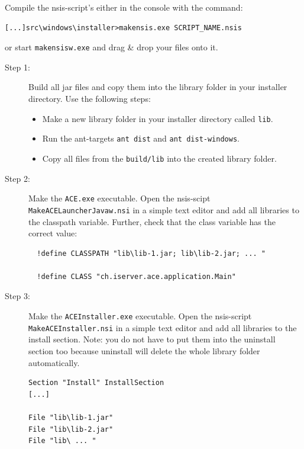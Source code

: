 \documentclass[11pt,a4paper]{article}
\begin{document}
Compile the nsis-script's either in the console with the command:
\begin{verbatim}
[...]src\windows\installer>makensis.exe SCRIPT_NAME.nsis
\end{verbatim}
or start \texttt{makensisw.exe} and drag \& drop your files onto it.

\begin{description}
\item[Step 1:] Build all jar files and copy them into the library folder in your installer directory. Use the following steps:
  \begin{itemize}
  \item Make a new library folder in your installer directory called \texttt{lib}.
  \item Run the ant-targets \texttt{ant dist} and \texttt{ant dist-windows}.
  \item Copy all files from the \texttt{build/lib} into the created library folder.
  \end{itemize}

\item[Step 2:] Make the \texttt{ACE.exe} executable. Open the nsis-scipt \texttt{MakeACELauncherJavaw.nsi} in a simple text editor and add all libraries to the classpath variable. Further, check that the class variable has the correct value:
\begin{verbatim}
  !define CLASSPATH "lib\lib-1.jar; lib\lib-2.jar; ... "
  
  !define CLASS "ch.iserver.ace.application.Main"
\end{verbatim}

\item[Step 3:] Make the \texttt{ACEInstaller.exe} executable. Open the nsis-script \texttt{MakeACEInstaller.nsi} in a simple text editor and add all libraries to the install section. Note: you do not have to put them into the uninstall section too because uninstall will delete the whole library folder automatically.
\begin{verbatim}
Section "Install" InstallSection
[...]

File "lib\lib-1.jar"
File "lib\lib-2.jar"
File "lib\ ... "
\end{verbatim}

\end{description}
\end{document}
